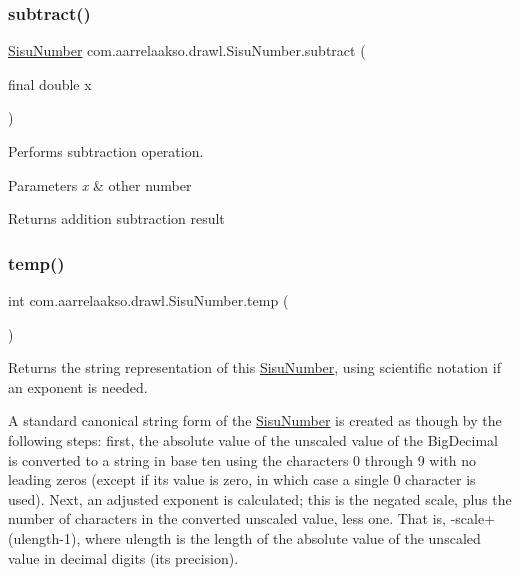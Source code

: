 \subsubsection{\texorpdfstring{subtract()}{subtract()}\hspace{0.1cm}{\footnotesize\ttfamily [3/3]}}
{\footnotesize\ttfamily \hyperlink{classcom_1_1aarrelaakso_1_1drawl_1_1_sisu_number}{Sisu\+Number} com.\+aarrelaakso.\+drawl.\+Sisu\+Number.\+subtract (\begin{DoxyParamCaption}\item[{final double}]{x }\end{DoxyParamCaption})\hspace{0.3cm}{\ttfamily [protected]}}



Performs subtraction operation. 


\begin{DoxyParams}{Parameters}
{\em x} & other number \\
\hline
\end{DoxyParams}
\begin{DoxyReturn}{Returns}
addition subtraction result 
\end{DoxyReturn}
\mbox{\label{classcom_1_1aarrelaakso_1_1drawl_1_1_sisu_number_a846e0834c619e63a8d85579484ab4276}} 
\subsubsection{\texorpdfstring{temp()}{temp()}}
{\footnotesize\ttfamily int com.\+aarrelaakso.\+drawl.\+Sisu\+Number.\+temp (\begin{DoxyParamCaption}{ }\end{DoxyParamCaption})\hspace{0.3cm}{\ttfamily [private]}}



Returns the string representation of this \hyperlink{classcom_1_1aarrelaakso_1_1drawl_1_1_sisu_number}{Sisu\+Number}, using scientific notation if an exponent is needed. 

A standard canonical string form of the \hyperlink{classcom_1_1aarrelaakso_1_1drawl_1_1_sisu_number}{Sisu\+Number} is created as though by the following steps\+: first, the absolute value of the unscaled value of the Big\+Decimal is converted to a string in base ten using the characters \textquotesingle{}0\textquotesingle{} through \textquotesingle{}9\textquotesingle{} with no leading zeros (except if its value is zero, in which case a single \textquotesingle{}0\textquotesingle{} character is used). Next, an adjusted exponent is calculated; this is the negated scale, plus the number of characters in the converted unscaled value, less one. That is, -\/scale+(ulength-\/1), where ulength is the length of the absolute value of the unscaled value in decimal digits (its precision). 

